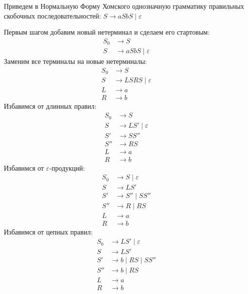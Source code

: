 \begin{example}
    Приведем в Нормальную Форму Хомского однозначную грамматику правильных скобочных последовательностей: $S \to a S b S \mid \varepsilon$

    Первым шагом добавим новый нетерминал и сделаем его стартовым:
    \begin{align*}
        S_0 & \to S                        \\
        S   & \to a S b S \mid \varepsilon
    \end{align*}
    Заменим все терминалы на новые нетерминалы:
    \begin{align*}
        S_0 & \to S                        \\
        S   & \to L S R S \mid \varepsilon \\
        L   & \to a                        \\
        R   & \to b
    \end{align*}
    Избавимся от длинных правил:
    \begin{align*}
        S_0 & \to S                     \\
        S   & \to L S' \mid \varepsilon \\
        S'  & \to S S''                 \\
        S'' & \to R S                   \\
        L   & \to a                     \\
        R   & \to b
    \end{align*}
    Избавимся от $\varepsilon$-продукций:
    \begin{align*}
        S_0 & \to S \mid \varepsilon \\
        S   & \to L S'               \\
        S'  & \to S'' \mid S S''     \\
        S'' & \to R   \mid R S       \\
        L   & \to a                  \\
        R   & \to b
    \end{align*}
    Избавимся от цепных правил:
    \begin{align*}
        S_0 & \to L S' \mid \varepsilon \\
        S   & \to L S'                  \\
        S'  & \to b \mid R S \mid S S'' \\
        S'' & \to b \mid R S            \\
        L   & \to a                     \\
        R   & \to b
    \end{align*}
\end{example}

